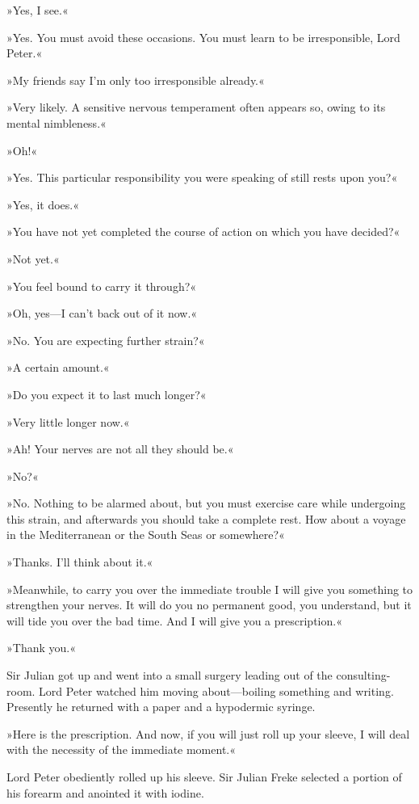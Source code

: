 »Yes, I see.«

»Yes. You must avoid these occasions. You must learn to be irresponsible, Lord Peter.«

»My friends say I'm only too irresponsible already.«

»Very likely. A sensitive nervous temperament often appears so, owing to its mental nimbleness.«

»Oh!«

»Yes. This particular responsibility you were speaking of still rests upon you?«

»Yes, it does.«

»You have not yet completed the course of action on which you have decided?«

»Not yet.«

»You feel bound to carry it through?«

»Oh, yes—I can't back out of it now.«

»No. You are expecting further strain?«

»A certain amount.«

»Do you expect it to last much longer?«

»Very little longer now.«

»Ah! Your nerves are not all they should be.«

»No?«

»No. Nothing to be alarmed about, but you must exercise care while undergoing this strain, and afterwards you should take a complete rest. How about a voyage in the Mediterranean or the South Seas or somewhere?«

»Thanks. I'll think about it.«

»Meanwhile, to carry you over the immediate trouble I will give you something to strengthen your nerves. It will do you no permanent good, you understand, but it will tide you over the bad time. And I will give you a prescription.«

»Thank you.«

Sir Julian got up and went into a small surgery leading out of the consulting-room. Lord Peter watched him moving about—boiling something and writing. Presently he returned with a paper and a hypodermic syringe.

»Here is the prescription. And now, if you will just roll up your sleeve, I will deal with the necessity of the immediate moment.«

Lord Peter obediently rolled up his sleeve. Sir Julian Freke selected a portion of his forearm and anointed it with iodine.


